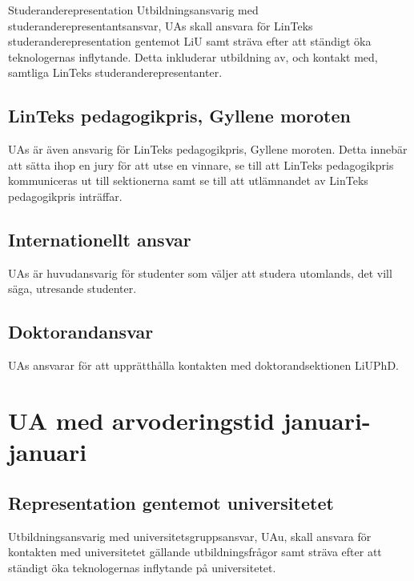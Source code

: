 Studeranderepresentation Utbildningsansvarig med
studeranderepresentantsansvar, UAs skall ansvara för LinTeks
studeranderepresentation gentemot LiU samt sträva efter att ständigt öka
teknologernas inflytande. Detta inkluderar utbildning av, och kontakt
med, samtliga LinTeks studeranderepresentanter.

\hypertarget{linteks-pedagogikpris-gyllene-moroten}{%
\subsection{LinTeks pedagogikpris, Gyllene
moroten}\label{linteks-pedagogikpris-gyllene-moroten}}

UAs är även ansvarig för LinTeks pedagogikpris, Gyllene moroten. Detta
innebär att sätta ihop en jury för att utse en vinnare, se till att
LinTeks pedagogikpris kommuniceras ut till sektionerna samt se till att
utlämnandet av LinTeks pedagogikpris inträffar.

\hypertarget{internationellt-ansvar-1}{%
\subsection{Internationellt ansvar}\label{internationellt-ansvar-1}}

UAs är huvudansvarig för studenter som väljer att studera utomlands, det
vill säga, utresande studenter.

\hypertarget{doktorandansvar}{%
\subsection{Doktorandansvar}\label{doktorandansvar}}

UAs ansvarar för att upprätthålla kontakten med doktorandsektionen
LiUPhD.

\hypertarget{ua-med-arvoderingstid-januari-januari}{%
\section{UA med arvoderingstid
januari-januari}\label{ua-med-arvoderingstid-januari-januari}}

\hypertarget{representation-gentemot-universitetet}{%
\subsection{Representation gentemot
universitetet}\label{representation-gentemot-universitetet}}

Utbildningsansvarig med universitetsgruppsansvar, UAu, skall ansvara för
kontakten med universitetet gällande utbildningsfrågor samt sträva efter
att ständigt öka teknologernas inflytande på universitetet.

